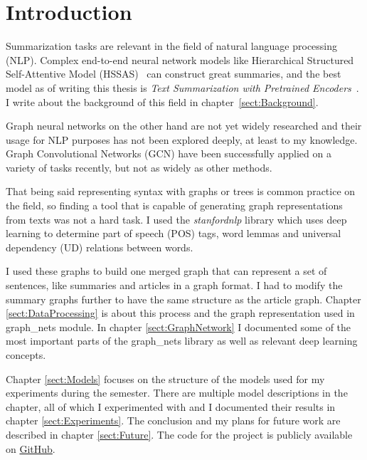 \chapter*{Introduction}\label{sect:Introduction}

Summarization tasks are relevant in the field of natural language processing (NLP). Complex end-to-end neural network models like Hierarchical Structured Self-Attentive Model (HSSAS)~\cite{HSSAS} can construct great summaries, and the best model as of writing this thesis is \textit{Text Summarization with Pretrained Encoders}~\cite{BERTsum}. I write about the background of this field in chapter~\ref{sect:Background}.

Graph neural networks on the other hand are not yet widely researched and their usage for NLP purposes has not been explored deeply, at least to my knowledge. Graph Convolutional Networks (GCN) have been successfully applied on a variety of tasks recently, but not as widely as other methods.

That being said representing syntax with graphs or trees is common practice on the field, so finding a tool that is capable of generating graph representations from texts was not a hard task. I used the \textit{stanfordnlp} library which uses deep learning to determine part of speech (POS) tags, word lemmas and universal dependency (UD) relations between words.

I used these graphs to build one merged graph that can represent a set of sentences, like summaries and articles in a graph format. I had to modify the summary graphs further to have the same structure as the article graph. Chapter \ref{sect:DataProcessing} is about this process and the graph representation used in graph\_nets module. In chapter \ref{sect:GraphNetwork} I documented some of the most important parts of the graph\_nets library as well as relevant deep learning concepts.

Chapter \ref{sect:Models} focuses on the structure of the models used for my experiments during the semester. There are multiple model descriptions in the chapter, all of which I experimented with and I documented their results in chapter \ref{sect:Experiments}. The conclusion and my plans for future work are described in chapter \ref{sect:Future}. The code for the project is publicly available on \href{https://github.com/GKingA/graph\_transformations}{GitHub}.